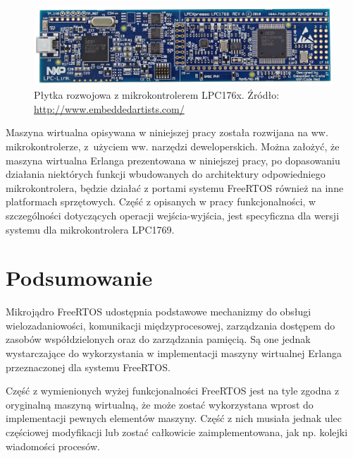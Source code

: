 \begin{figure}[h]
\centerline{\includegraphics[scale=0.4]{lpc176x}}
\caption{Płytka rozwojowa z mikrokontrolerem LPC176x. Źródło: \url{http://www.embeddedartists.com/}}
\label{fig:lpc1769}
\end{figure}

Maszyna wirtualna opisywana w niniejszej pracy została rozwijana na ww. mikrokontrolerze, z~użyciem ww. narzędzi deweloperskich. Można założyć, że maszyna wirtualna Erlanga prezentowana w niniejszej pracy, po dopasowaniu działania niektórych funkcji wbudowanych do architektury odpowiedniego mikrokontrolera, będzie działać z portami systemu FreeRTOS również na inne platformach sprzętowych. Część z opisanych w pracy funkcjonalności, w szczególności dotyczących operacji wejścia-wyjścia, jest specyficzna dla wersji systemu dla mikrokontrolera LPC1769.

\section{Podsumowanie}
\label{sec:rtosPodsumowanie}

Mikrojądro FreeRTOS udostępnia podstawowe mechanizmy do obsługi wielozadaniowości, komunikacji międzyprocesowej, zarządzania dostępem do zasobów współdzielonych oraz do zarządzania pamięcią. Są one jednak wystarczające do wykorzystania w implementacji maszyny wirtualnej Erlanga przeznaczonej dla systemu FreeRTOS.

Część z wymienionych wyżej funkcjonalności FreeRTOS jest na tyle zgodna z oryginalną maszyną wirtualną, że może zostać wykorzystana wprost do implementacji pewnych elementów maszyny. Część z nich musiała jednak ulec częściowej modyfikacji lub zostać całkowicie zaimplementowana, jak np. kolejki wiadomości procesów. 
